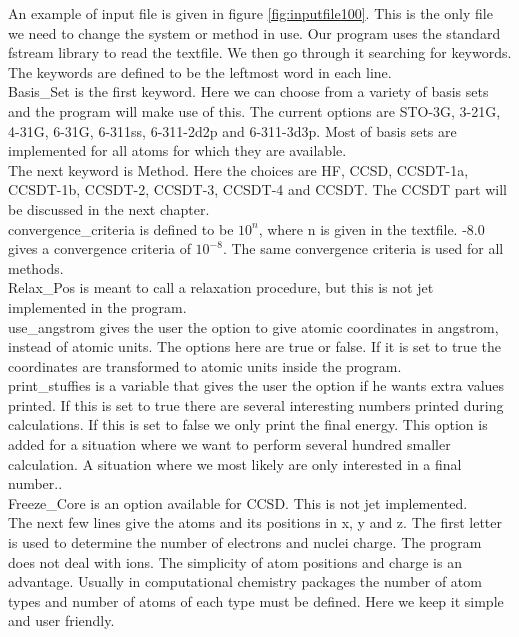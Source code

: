 An example of input file is given in figure \ref{fig:inputfile100}. This is the only file we need to change the system or method in use. Our program uses the standard fstream library to read the textfile. We then go through it searching for keywords. The keywords are defined to be the leftmost word in each line. \\

Basis\_Set is the first keyword. Here we can choose from a variety of basis sets and the program will make use of this. The current options are STO-3G, 3-21G, 4-31G, 6-31G, 6-311ss, 6-311-2d2p and 6-311-3d3p. Most of basis sets are implemented for all atoms for which they are available. \\

The next keyword is Method. Here the choices are HF, CCSD, CCSDT-1a, CCSDT-1b, CCSDT-2, CCSDT-3, CCSDT-4 and CCSDT. The CCSDT part will be discussed in the next chapter. \\

convergence\_criteria is defined to be $10^{n}$, where n is given in the textfile. -8.0 gives a convergence criteria of $10^{-8}$. The same convergence criteria is used for all methods. \\

Relax\_Pos is meant to call a relaxation procedure, but this is not jet implemented in the program. \\

use\_angstrom gives the user the option to give atomic coordinates in angstrom, instead of atomic units. The options here are true or false. If it is set to true the coordinates are transformed to atomic units inside the program. \\

print\_stuffies is a variable that gives the user the option if he wants extra values printed. If this is set to true there are several interesting numbers printed during calculations. If this is set to false we only print the final energy. This option is added for a situation where we want to perform several hundred smaller calculation. A situation where we most likely are only interested in a final number.. \\

Freeze\_Core is an option available for CCSD. This is not jet implemented. \\

The next few lines give the atoms and its positions in x, y and z. The first letter is used to determine the number of electrons and nuclei charge. The program does not deal with ions. The simplicity of atom positions and charge is an advantage. Usually in computational chemistry packages the number of atom types and number of atoms of each type must be defined. Here we keep it simple and user friendly. \\

